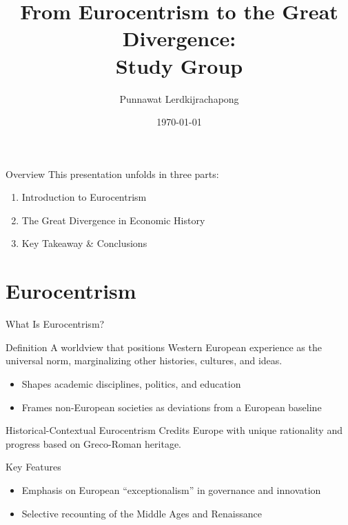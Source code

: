 \documentclass[aspectratio=169]{beamer}
\title[Eurocentrism \& Great Divergence]{From Eurocentrism to the Great Divergence:\\Study Group}
\author[P.\,Lerdkijrachapong]{Punnawat Lerdkijrachapong}
\institute[Study Group]{Study Group 2}
\date{\today}
\begin{document}
\begin{frame}
  \titlepage
\end{frame}

\begin{frame}{Overview}
  This presentation unfolds in three parts:
  \begin{enumerate}[<+->]
    \item Introduction to Eurocentrism
    \item The Great Divergence in Economic History
    \item Key Takeaway \& Conclusions
  \end{enumerate}
\end{frame}

\section{Eurocentrism}

\begin{frame}{What Is Eurocentrism?}
  \begin{block}{Definition}
    A worldview that positions Western European experience as the universal norm, marginalizing other histories, cultures, and ideas.
  \end{block}
  \vspace{0.5em}
  \begin{itemize}[<+->]
    \item Shapes academic disciplines, politics, and education  
    \item Frames non-European societies as deviations from a European baseline  
  \end{itemize}
\end{frame}

\begin{frame}{Historical-Contextual Eurocentrism}
  Credits Europe with unique rationality and progress based on Greco-Roman heritage.
  \vspace{0.5em}
  \begin{block}{Key Features}
    \begin{itemize}[<+->]
      \item Emphasis on European “exceptionalism” in governance and innovation  
      \item Selective recounting of the Middle Ages and Renaissance  
    \end{itemize}
  \end{block}
\end{frame}
\end{document}
